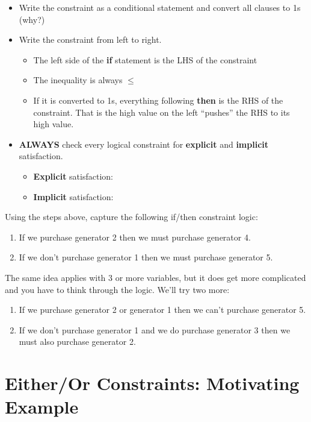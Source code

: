 \documentclass[11pt]{article}
\theoremstyle{definition}
\begin{document}
\begin{itemize}
\item Write the constraint as a conditional statement and convert all clauses to 1s (why?) \vspace{0.5in}
\item Write the constraint from left to right.
	\begin{itemize}
	\item The left side of the \textbf{if} statement is the LHS of the constraint
	\item The inequality is always $\leq$
	\item If it is converted to 1s, everything following \textbf{then} is the RHS of the constraint. That is the high value on the left ``pushes'' the RHS to its high value.
	\end{itemize}
\item \textbf{ALWAYS} check every logical constraint for \textbf{explicit} and \textbf{implicit} satisfaction.
	\begin{itemize}
	\item \textbf{Explicit} satisfaction: \vspace{1in}
	\item \textbf{Implicit} satisfaction: \newpage
	\end{itemize}
\end{itemize}

Using the steps above, capture the following if/then constraint logic:
\begin{enumerate}[resume]
\item If we purchase generator 2 then we must purchase generator 4. \vfill
\item If we don't purchase generator 1 then we must purchase generator 5. \vfill
\end{enumerate}

\newpage

The same idea applies with 3 or more variables, but it does get more complicated and you have to think through the logic. We'll try two more:
\begin{enumerate}[resume]
\item If we purchase generator 2 or generator 1 then we can't purchase generator 5. \vfill
\item If we don't purchase generator 1 and we do purchase generator 3 then we must also purchase generator 2. \vfill
\end{enumerate}
\newpage



\section{Either/Or Constraints: Motivating Example}
\end{document}
